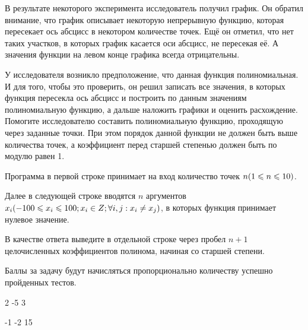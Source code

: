 
В результате некоторого эксперимента исследователь получил график. Он обратил внимание, что график описывает некоторую непрерывную функцию, которая пересекает ось абсцисс в некотором количестве точек. Ещё он отметил, что нет таких участков, в которых график касается оси абсцисс, не пересекая её. А значения функции на левом конце графика всегда отрицательны.

У исследователя возникло предположение, что данная функция полиномиальная. И для того, чтобы это проверить, он решил записать все значения, в которых функция пересекла ось абсцисс и построить по данным значениям полиномиальную функцию, а дальше наложить графики и оценить расхождение. Помогите исследователю составить полиномиальную функцию, проходящую через заданные точки. При этом порядок данной функции не должен быть выше количества точек, а коэффициент перед старшей степенью должен быть по модулю равен 1.

Программа в первой строке принимает на вход количество точек $n\space(1\leq n\leq 10)$.

Далее в следующей строке вводятся $n$  аргументов $x_i \space (-100 \leq x_i \leq 100; x_i \in Z; \forall i, j:x_i \neq x_j)$, в которых функция принимает нулевое значение. 

\outputfmtSection
В качестве ответа выведите в отдельной строке через пробел $n+1$ целочисленных коэффициентов полинома, начиная со старшей степени.

\markSection

Баллы за задачу будут начисляться пропорционально количеству успешно пройденных тестов.


\begin{myverbbox}[\small]{\vinput}
    2
    -5 3
\end{myverbbox}

\begin{myverbbox}[\small]{\voutput}
    -1 -2 15
\end{myverbbox}

